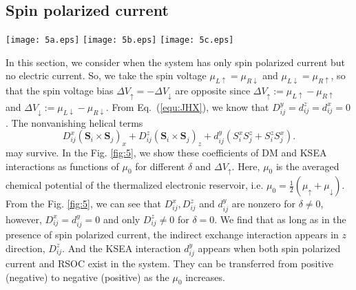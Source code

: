 \documentclass[aps,prb,twocolumn,showpacs,amssymb]{revtex4-1}
\begin{document}
\subsection{Spin polarized current}
\begin{figure*}[!htp]
\centering
\texttt{[image: 5a.eps]}\hspace{-0.6cm}
\texttt{[image: 5b.eps]}\hspace{-0.6cm}
\texttt{[image: 5c.eps]}
\vspace{-0.0cm}
\caption{(colour online) Magnetic exchange interactions as functions of the average chemical potential $\mu_0$. Here, $\varepsilon=0meV,t=1meV,J=5meV,T_L=T_R=1K, \gamma_L=\gamma_R=\frac{1}{12}meV$,
${\Delta}V_\uparrow=-{\Delta}V_\downarrow$, $\mu_{L\uparrow}=\mu_{R\downarrow}=\frac{\Delta{V}_\uparrow}{2}+\mu_0$, and $\mu_{L\downarrow}=\mu_{R\uparrow}=-\frac{\Delta{V}_\uparrow}{2}+\mu_0$,
while the colors refer to different $\delta$ and $V_\uparrow$. The plots in (a) is $D^{x}_{ij}$, (b) is $D^{z}_{ij}$ and (c) is $d^{y}_{ij}$.}\label{fig:5}
\end{figure*}
In this section, we consider when the system has only spin polarized current but no electric current. So, we take the spin voltage $\mu_{L\uparrow}=\mu_{R\downarrow}$ and $\mu_{L\downarrow}=\mu_{R\uparrow}$, so that the spin voltage bias ${\Delta}V_\uparrow=-{\Delta}V_\downarrow$ are opposite since ${\Delta}V_\uparrow:=\mu_{L\uparrow}-\mu_{R\uparrow}$ and ${\Delta}V_\downarrow:=\mu_{L\downarrow}-\mu_{R\downarrow}$. From Eq.~(\ref{equ:JHX}), we know that $D^y_{ij}=d^z_{ij}=d^x_{ij}=0$.
The nonvanishing helical terms
\begin{equation}\label{equ:Esd}
D^x_{ij}(\bm{S}_{i}\times\bm{S}_{j})_x+D^z_{ij}(\bm{S}_{i}\times\bm{S}_{j})_z
+d^y_{ij}(S^x_iS^z_j+S^z_iS^x_j).
\end{equation}
may survive.
In the Fig. \ref{fig:5}, we show these coefficients of DM and KSEA interactions as functions of $\mu_0$ for different $\delta$ and ${\Delta}V_\uparrow$. Here, $\mu_0$ is the averaged chemical potential of the thermalized electronic reservoir, i.e. $\mu_0=\frac{1}{2}(\mu_{\uparrow}+\mu_{\downarrow})$.
From the Fig. \ref{fig:5}, we can see that $D^{x}_{ij}, D^{z}_{ij}$ and $d^{y}_{ij}$ are nonzero for $\delta\neq0$, however, $D^{x}_{ij}=d^{y}_{ij}=0$ and only $D^{z}_{ij}\neq0$ for $\delta=0$. We find that as long as in the presence of spin polarized current, the indirect exchange interaction appears in $z$ direction,  $D^{z}_{ij}$. And the KSEA interaction $d^{y}_{ij}$ appears when both spin polarized current and RSOC exist in the system. They can be transferred from positive (negative) to negative (positive) as the $\mu_0$ increases.
\end{document}
